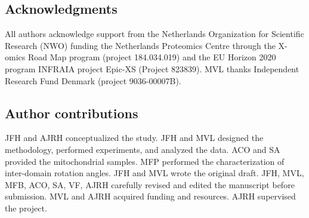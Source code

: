 \subsection*{Acknowledgments}
All authors acknowledge support from the Netherlands Organization for Scientific Research (NWO) funding the Netherlands Proteomics Centre through the X-omics Road Map program (project 184.034.019) and the EU Horizon 2020 program INFRAIA project Epic-XS (Project 823839). MVL thanks Independent Research Fund Denmark (project 9036-00007B).
%
\subsection*{Author contributions}
JFH and AJRH conceptualized the study. JFH and MVL designed the methodology, performed experiments, and analyzed the data. ACO and SA provided the mitochondrial samples. MFP performed the characterization of inter-domain rotation angles. JFH and MVL wrote the original draft. JFH, MVL, MFB, ACO, SA, VF, AJRH carefully revised and edited the manuscript before submission. MVL and AJRH acquired funding and resources. AJRH supervised the project.
%
